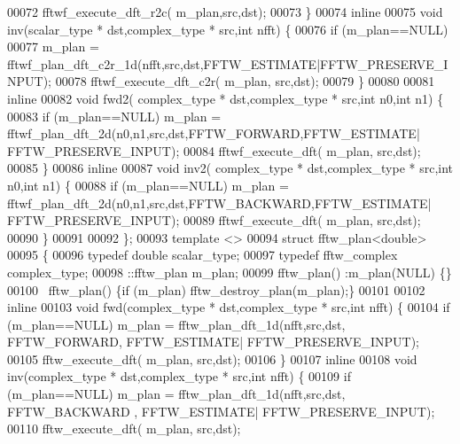 \begin{DoxyCode}
00072           fftwf\_execute\_dft\_r2c( m\_plan,src,dst);
00073       \}
00074       \textcolor{keyword}{inline}
00075       \textcolor{keywordtype}{void} inv(scalar\_type * dst,complex\_type * src,\textcolor{keywordtype}{int} nfft) \{
00076           \textcolor{keywordflow}{if} (m\_plan==NULL)
00077               m\_plan = fftwf\_plan\_dft\_c2r\_1d(nfft,src,dst,FFTW\_ESTIMATE|FFTW\_PRESERVE\_INPUT);
00078           fftwf\_execute\_dft\_c2r( m\_plan, src,dst);
00079       \}
00080 
00081       \textcolor{keyword}{inline} 
00082       \textcolor{keywordtype}{void} fwd2( complex\_type * dst,complex\_type * src,\textcolor{keywordtype}{int} n0,\textcolor{keywordtype}{int} n1) \{
00083           \textcolor{keywordflow}{if} (m\_plan==NULL) m\_plan = fftwf\_plan\_dft\_2d(n0,n1,src,dst,FFTW\_FORWARD,FFTW\_ESTIMATE|
      FFTW\_PRESERVE\_INPUT);
00084           fftwf\_execute\_dft( m\_plan, src,dst);
00085       \}
00086       \textcolor{keyword}{inline} 
00087       \textcolor{keywordtype}{void} inv2( complex\_type * dst,complex\_type * src,\textcolor{keywordtype}{int} n0,\textcolor{keywordtype}{int} n1) \{
00088           \textcolor{keywordflow}{if} (m\_plan==NULL) m\_plan = fftwf\_plan\_dft\_2d(n0,n1,src,dst,FFTW\_BACKWARD,FFTW\_ESTIMATE|
      FFTW\_PRESERVE\_INPUT);
00089           fftwf\_execute\_dft( m\_plan, src,dst);
00090       \}
00091 
00092   \};
00093   \textcolor{keyword}{template} <> 
00094   \textcolor{keyword}{struct }fftw\_plan<double>
00095   \{
00096       \textcolor{keyword}{typedef} \textcolor{keywordtype}{double} scalar\_type;
00097       \textcolor{keyword}{typedef} fftw\_complex complex\_type;
00098       ::fftw\_plan m\_plan;
00099       fftw\_plan() :m\_plan(NULL) \{\}
00100       ~fftw\_plan() \{\textcolor{keywordflow}{if} (m\_plan) fftw\_destroy\_plan(m\_plan);\}
00101 
00102       \textcolor{keyword}{inline}
00103       \textcolor{keywordtype}{void} fwd(complex\_type * dst,complex\_type * src,\textcolor{keywordtype}{int} nfft) \{
00104           \textcolor{keywordflow}{if} (m\_plan==NULL) m\_plan = fftw\_plan\_dft\_1d(nfft,src,dst, FFTW\_FORWARD, FFTW\_ESTIMATE|
      FFTW\_PRESERVE\_INPUT);
00105           fftw\_execute\_dft( m\_plan, src,dst);
00106       \}
00107       \textcolor{keyword}{inline}
00108       \textcolor{keywordtype}{void} inv(complex\_type * dst,complex\_type * src,\textcolor{keywordtype}{int} nfft) \{
00109           \textcolor{keywordflow}{if} (m\_plan==NULL) m\_plan = fftw\_plan\_dft\_1d(nfft,src,dst, FFTW\_BACKWARD , FFTW\_ESTIMATE|
      FFTW\_PRESERVE\_INPUT);
00110           fftw\_execute\_dft( m\_plan, src,dst);

\end{DoxyCode}
